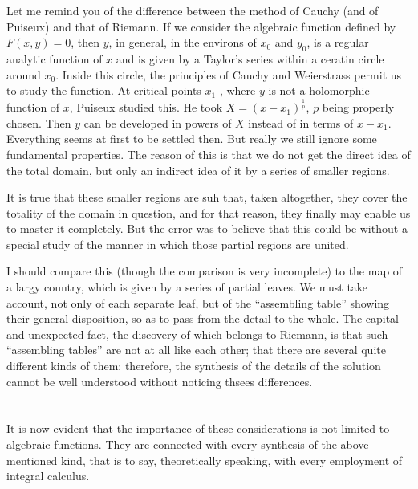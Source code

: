 \documentclass[12pt,oneside]{book}
\begin{document}
Let me remind you of the difference between the method of Cauchy (and of Puiseux) and that of Riemann. If we consider the algebraic function defined by $F(x,y)=0$, then $y$, in general, in the environs of $x_0$ and $y_0$, is a regular analytic function of $x$ and is given by a Taylor's series within a ceratin circle around $x_0$. Inside this circle, the principles of Cauchy and Weierstrass permit us to study the function. At critical points $x_1$ , where $y$ is not a holomorphic function of $x$, Puiseux studied this. He took $X=(x-x_1)^\frac{1}{p}$, $p$ being properly chosen. Then $y$ can be developed in powers of $X$ instead of in terms of $x-x_1$. Everything seems at first to be settled then. But really we still ignore some fundamental properties. The reason of this is that we do not get the direct idea of the total domain, but only an indirect idea of it by a series of smaller regions. \par

It is true that these smaller regions are suh that, taken altogether, they cover the totality of the domain in question, and for that reason, they finally may enable us to master it completely. But the error was to believe that this could be without a special study of the manner in which those partial regions are united. \par

I should compare this (though the comparison is very incomplete) to the map of a largy country, which is given by a series of partial leaves. We must take account, not only of each separate leaf, but of the ``assembling table'' showing their general disposition, so as to pass from the detail to the whole. The capital and unexpected fact, the discovery of which belongs to Riemann, is that such ``assembling tables'' are not at all like each other; that there are several quite different kinds of them: therefore, the synthesis of the details of the solution cannot be well understood without noticing thsees differences. \par

\section{}
It is now evident that the importance of these considerations is not limited to algebraic functions. They are connected with every synthesis of the above mentioned kind, that is to say, theoretically speaking, with every employment of integral calculus. \par
\end{document}
